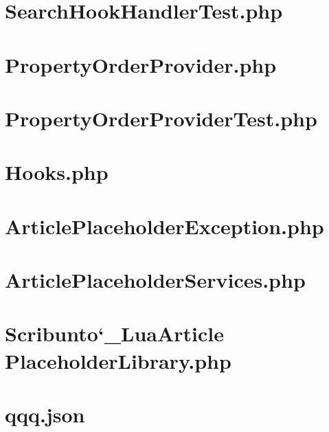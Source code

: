 \section{SearchHookHandlerTest.php}


\section{PropertyOrderProvider.php}


\section{PropertyOrderProviderTest.php}


\section{Hooks.php}


\section{ArticlePlaceholderException.php}


\section{ArticlePlaceholderServices.php}


\section{Scribunto\char`_LuaArticle PlaceholderLibrary.php}


\section{qqq.json}


